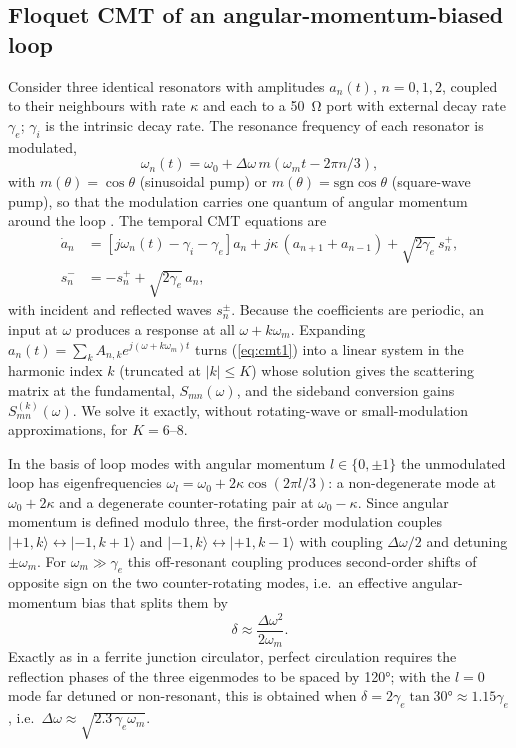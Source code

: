 \documentclass[journal]{IEEEtran}
\begin{document}
\subsection{Floquet CMT of an angular-momentum-biased loop}
Consider three identical resonators with amplitudes $a_n(t)$, $n=0,1,2$, coupled to their neighbours with rate $\kappa$ and each to a \SI{50}{\ohm} port with external decay rate $\gamma_e$; $\gamma_i$ is the intrinsic decay rate. The resonance frequency of each resonator is modulated,
\begin{equation}
\omega_n(t)=\omega_0+\Delta\omega\, m(\omega_m t-2\pi n/3),
\label{eq:mod}
\end{equation}
with $m(\theta)=\cos\theta$ (sinusoidal pump) or $m(\theta)=\mathrm{sgn}\cos\theta$ (square-wave pump), so that the modulation carries one quantum of angular momentum around the loop \cite{sounas2013giant,estep2014magnetic}. The temporal CMT equations are
\begin{align}
\dot a_n &= \left[j\omega_n(t)-\gamma_i-\gamma_e\right]a_n + j\kappa\,(a_{n+1}+a_{n-1}) + \sqrt{2\gamma_e}\,s^{+}_n,\label{eq:cmt1}\\
s^{-}_n &= -s^{+}_n + \sqrt{2\gamma_e}\,a_n,\label{eq:cmt2}
\end{align}
with incident and reflected waves $s^{\pm}_n$. Because the coefficients are periodic, an input at $\omega$ produces a response at all $\omega+k\omega_m$. Expanding $a_n(t)=\sum_k A_{n,k}e^{j(\omega+k\omega_m)t}$ turns (\ref{eq:cmt1}) into a linear system in the harmonic index $k$ (truncated at $|k|\le K$) whose solution gives the scattering matrix at the fundamental, $S_{mn}(\omega)$, and the sideband conversion gains $S^{(k)}_{mn}(\omega)$. We solve it exactly, without rotating-wave or small-modulation approximations, for $K=6$--$8$.

In the basis of loop modes with angular momentum $l\in\{0,\pm1\}$ the unmodulated loop has eigenfrequencies $\omega_l=\omega_0+2\kappa\cos(2\pi l/3)$: a non-degenerate mode at $\omega_0+2\kappa$ and a degenerate counter-rotating pair at $\omega_0-\kappa$. Since angular momentum is defined modulo three, the first-order modulation couples $|{+1},k\rangle\leftrightarrow|{-1},k{+}1\rangle$ and $|{-1},k\rangle\leftrightarrow|{+1},k{-}1\rangle$ with coupling $\Delta\omega/2$ and detuning $\pm\omega_m$. For $\omega_m\gg\gamma_e$ this off-resonant coupling produces second-order shifts of opposite sign on the two counter-rotating modes, i.e.\ an effective angular-momentum bias that splits them by
\begin{equation}
\delta\approx\frac{\Delta\omega^2}{2\omega_m}.
\label{eq:split}
\end{equation}
Exactly as in a ferrite junction circulator, perfect circulation requires the reflection phases of the three eigenmodes to be spaced by \ang{120}; with the $l=0$ mode far detuned or non-resonant, this is obtained when $\delta=2\gamma_e\tan\ang{30}\approx1.15\gamma_e$, i.e.\ $\Delta\omega\approx\sqrt{2.3\,\gamma_e\omega_m}$.
\end{document}

